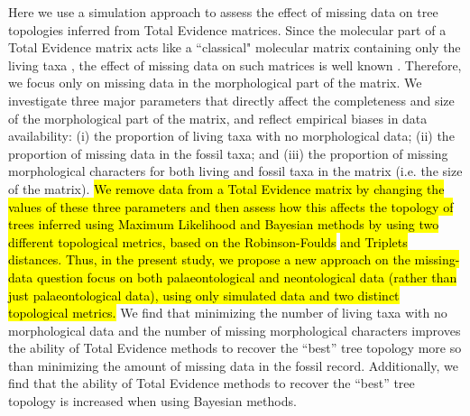 \documentclass[12pt,letterpaper]{article}
\begin{document}
Here we use a simulation approach to assess the effect of missing data on tree topologies inferred from Total Evidence matrices.
Since the molecular part of a Total Evidence matrix acts like a ``classical" molecular matrix containing only the living taxa \citep{ronquista2012}, the effect of missing data on such matrices is well known \citep{wiensmissing2006,wiensmissing2008,lemmonthe2009,rouresite-specific2011}.
Therefore, we focus only on missing data in the morphological part of the matrix.
We investigate three major parameters that directly affect the completeness and size of the morphological part of the matrix, and reflect empirical biases in data availability: (i) the proportion of living taxa with no morphological data; (ii) the proportion of missing data in the fossil taxa; and (iii) the proportion of missing morphological characters for both living and fossil taxa in the matrix (i.e. the size of the matrix).
\hl{We remove data from a Total Evidence matrix by changing the values of these three parameters and then assess how this affects the topology of trees inferred using Maximum Likelihood and Bayesian methods by using two different topological metrics, based on the Robinson-Foulds }\citep{RF1981}\hl{ and Triplets }\citep{critchlowthe1996}\hl{ distances.
Thus, in the present study, we propose a new approach on the missing-data question focus on both palaeontological and neontological data (rather than just palaeontological data), using only simulated data and two distinct topological metrics.}
We find that minimizing the number of living taxa with no morphological data and the number of missing morphological characters improves the ability of Total Evidence methods to recover the ``best'' tree topology more so than minimizing the amount of missing data in the fossil record.
Additionally, we find that the ability of Total Evidence methods to recover the ``best'' tree topology is increased when using Bayesian methods.


%
%
 
\end{document}
